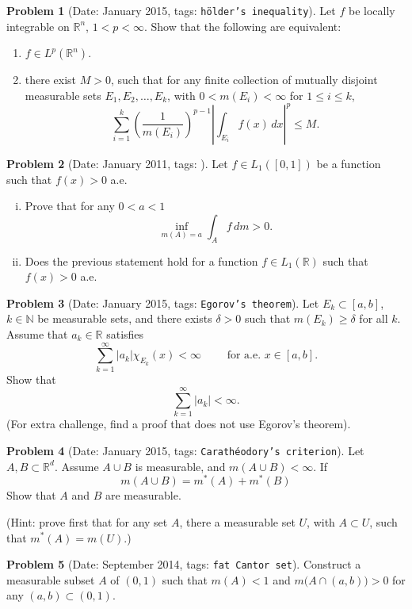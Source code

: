 \documentclass[11pt, notitlepage]{article}
\theoremstyle{definition}
\theoremstyle{definition}
\theoremstyle{definition}
\newtheorem{probstate}{Problem}
\theoremstyle{remark}
\newenvironment{problem}[2]{
    \begin{probstate}[Date: #1, tags: \texttt{#2}]
}
{
  \end{probstate}
}
\begin{document}
\begin{problem}{January 2015}{h\"older's inequality}
Let $f$ be locally integrable on $\mathbb R^n$, $1<p<\infty$. Show that the following are equivalent:

\begin{enumerate}[(1)]
    \item $f\in L^p(\mathbb R^n)$.
    \item there exist $M>0$, such that for any finite collection of mutually disjoint measurable sets $E_1, E_2,\dots, E_k$, with $0<m(E_i) <\infty$ for $1\le i\le k$, 
$$\sum_{i=1}^k \left(\frac1{m(E_i)}\right)^{p-1}\left|\int_{E_i} f(x)\,dx\right|^p\le M.$$
\end{enumerate}
\end{problem}

\begin{problem}{January 2011}{}
  Let $f \in L_1([0,1])$ be a function such that $f(x)>0$ a.e.
 \begin{enumerate}[(i)]
 \item Prove that for any $0<a<1$
 \[
   \inf_{m(A)=a} \int_A f \, dm >0.
 \]
 \item Does the previous statement hold for a function $f \in L_1(\mathbb R)$ such that $f(x)>0$ a.e.
 \end{enumerate}
\end{problem}

\begin{problem}{January 2015}{Egorov's theorem}
Let $E_k\subset [a,b]$, $k\in\mathbb N$ be measurable sets, and there exists $\delta>0$ such that $m(E_k)\ge \delta$ for all $k$.
 Assume that $a_k\in\mathbb R$ satisfies 
$$\sum_{k=1}^\infty |a_k|\chi_{E_k}(x)<\infty\qquad \text{ for a.e. }  x\in [a,b].$$
Show that
$$\sum_{k=1}^\infty |a_k|<\infty.$$
(For extra challenge, find a proof that does not use Egorov's theorem).
\end{problem}

\begin{problem}{January 2015}{Carath\'eodory's criterion}
Let $A, B\subset \mathbb R^d$. Assume $A\cup B$ is measurable, and $m(A\cup B)<\infty$. If
$$m(A\cup B)=m^*(A)+m^*(B)$$
Show that $A$ and $B$ are measurable. 

(Hint: prove first that for any set $A$, there a measurable set $U$, with $A\subset U$, such that $m^*(A)=m(U)$.)
\end{problem}

\begin{problem}{September 2014}{fat Cantor set}
Construct a measurable subset $A$ of $(0,1)$ such that $m(A)<1$ and 
 $m \big(A \cap (a,b) \big) >0$ for any $(a,b) \subset (0,1)$.
\end{problem}
\end{document}
